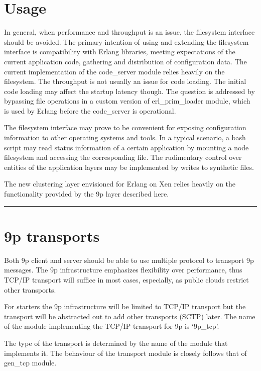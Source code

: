 \chapter{Usage}
\label{usage}

In general, when performance and throughput is an issue, the filesystem
interface should be avoided. The primary intention of using and extending the
filesystem interface is compatibility with Erlang libraries, meeting
expectations of the current application code, gathering and distribution of
configuration data. The current implementation of the code\_server module relies
heavily on the filesystem. The throughput is not usually an issue for code
loading. The initial code loading may affect the startup latency though. The
question is addressed by bypassing file operations in a custom version of
erl\_prim\_loader module, which is used by Erlang before the code\_server is
operational.

The filesystem interface may prove to be convenient for exposing configuration
information to other operating systems and tools. In a typical scenario, a bash
script may read status information of a certain application by mounting a
node filesystem and accessing the corresponding file. The rudimentary control
over entities of the application layers may be implemented by writes to
synthetic files.

The new clustering layer envisioned for Erlang on Xen relies heavily on the
functionality provided by the 9p layer described here.

\begin{center}\rule{3in}{0.4pt}\end{center}


\chapter{9p transports}
\label{ptransports}

Both 9p client and server should be able to use multiple protocol to transport
9p messages. The 9p infrastructure emphasizes flexibility over performance,
thus TCP\slash IP transport will suffice in most cases, especially, as public clouds
restrict other transports.

For starters the 9p infrastructure will be limited to TCP\slash IP transport but
the transport will be abstracted out to add other transports (SCTP) later. The
name of the module implementing the TCP\slash IP transport for 9p is `9p\_tcp'.

The type of the transport is determined by the name of the module that
implements it. The behaviour of the transport module is closely follows that of
gen\_tcp module.

